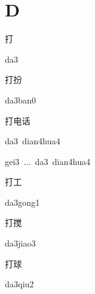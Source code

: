 ﻿%
\section*{D}
\begin{multicols*}{2}

\begin{verbete}[da3]{打}
\begin{pronuncia}{da3}
\end{pronuncia}
\end{verbete}

\begin{verbete}[da3ban0]{打扮}
\begin{pronuncia}{da3ban0}
\end{pronuncia}
\end{verbete}

\begin{verbete}{打电话}
\begin{pronuncia}{da3\ dian4hua4}
\end{pronuncia}
\begin{pronuncia}{gei3\ ...\ da3\ dian4hua4}
\end{pronuncia}
\end{verbete}

\begin{verbete}[da3gong1]{打工}
\begin{pronuncia}{da3gong1}
\end{pronuncia}
\end{verbete}

\begin{verbete}[da3jiao3]{打搅}
\begin{pronuncia}{da3jiao3}
\end{pronuncia}
\end{verbete}

\begin{verbete}[da3qiu2]{打球}
\begin{pronuncia}{da3qiu2}
\end{pronuncia}
\end{verbete}


\end{multicols*}
